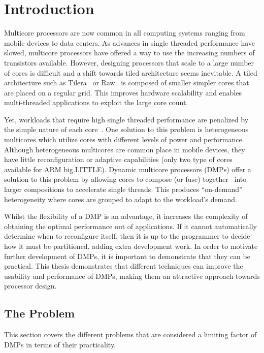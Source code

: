 \chapter{Introduction}
Multicore processors are now common in all computing systems ranging from mobile devices to data centers.
As advances in single threaded performance have slowed, multicore processors have offered a way to use the increasing numbers of transistors available.
However, designing processors that scale to a large number of cores is difficult and a shift towards tiled architecture seems inevitable.
A tiled architecture such as Tilera~\cite{bell2008tile} or Raw~\cite{waingold1997raw} is composed of smaller simpler cores that are placed on a regular grid.
This improves hardware scalability and enables multi-threaded applications to exploit the large core count.

Yet, workloads that require high single threaded performance are penalized by the simple nature of each core~\cite{eyerman2010amdahl}.
One solution to this problem is heterogeneous multicores which utilize cores with different levels of power and performance.
Although heterogeneous multicores are common place in mobile devices, they have little reconfiguration or adaptive capabilities (\eg only two type of cores available for ARM big.LITTLE).
Dynamic multicore processors (DMPs) offer a solution to this problem by allowing cores to compose (or fuse) together~\cite{ipek2007CoreFusion} into larger compositions to accelerate single threads.
This produces ``on-demand'' heterogeneity where cores are grouped to adapt to the workload's demand.

Whilst the flexibility of a DMP is an advantage, it increases the complexity of obtaining the optimal performance out of applications.
If it cannot automatically determine when to reconfigure itself, then it is up to the programmer to decide how it must be partitioned, adding extra development work.
In order to motivate further development of DMPs, it is important to demonstrate that they can be practical.
This thesis demonstrates that different techniques can improve the usability and performance of DMPs, making them an attractive approach towards processor design. 

\section{The Problem}
This section covers the different problems that are considered a limiting factor of DMPs in terms of their practicality.
